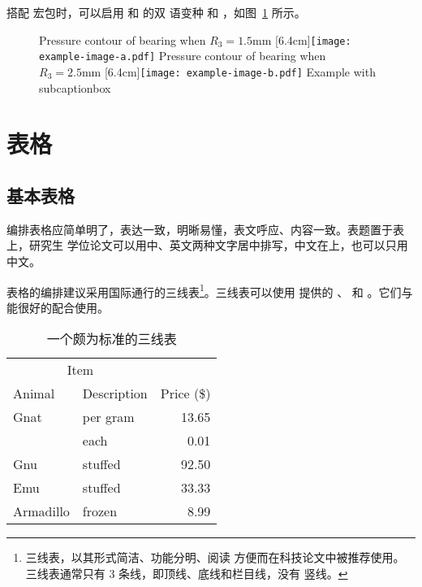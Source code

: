 搭配  宏包时，可以启用  和  的双
语变种  和 ，如图~\ref{fig:bisubcaptionbox}
所示。

\begin{figure}[!hbtp]
  \centering
                  {Pressure contour of bearing when $R_3 = 1.5\text{mm}$}%
                  [6.4cm]{\texttt{[image: example-image-a.pdf]}}
  \hspace{1cm}
                  {Pressure contour of bearing when $R_3 = 2.5\text{mm}$}%
                  [6.4cm]{\texttt{[image: example-image-b.pdf]}}
            {Example with subcaptionbox}
  \label{fig:bisubcaptionbox}
\end{figure}


\section{表格}

\subsection{基本表格}

编排表格应简单明了，表达一致，明晰易懂，表文呼应、内容一致。表题置于表上，研究生
学位论文可以用中、英文两种文字居中排写，中文在上，也可以只用中文。

表格的编排建议采用国际通行的三线表\footnote{三线表，以其形式简洁、功能分明、阅读
方便而在科技论文中被推荐使用。三线表通常只有 3 条线，即顶线、底线和栏目线，没有
竖线。}。三线表可以使用  提供的 、 和
。它们与  能很好的配合使用。

\begin{table}[!hpt]
  \caption[一个颇为标准的三线表]{一个颇为标准的三线表\footnotemark}
  \label{tab:firstone}
  \centering
  \begin{tabular}{@{}llr@{}} \toprule
    \multicolumn{2}{c}{Item} \\ \cmidrule(r){1-2}
    Animal & Description & Price (\$)\\ \midrule
    Gnat  & per gram  & 13.65 \\
          & each      & 0.01 \\
    Gnu   & stuffed   & 92.50 \\
    Emu   & stuffed   & 33.33 \\
    Armadillo & frozen & 8.99 \\ \bottomrule
  \end{tabular}
\end{table}

